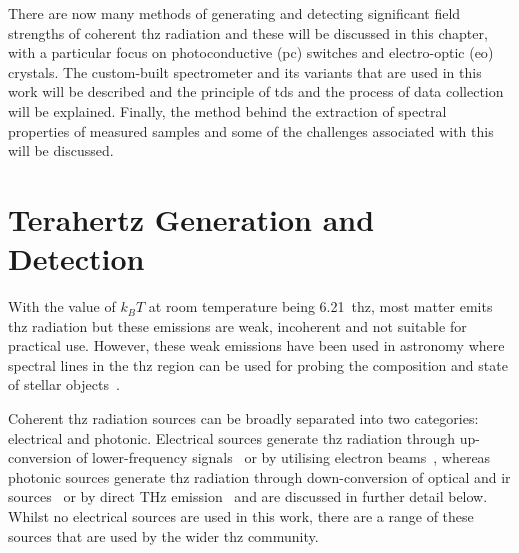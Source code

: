 There are now many methods of generating and detecting significant field strengths of coherent \acrshort{thz} radiation and these will be discussed in this chapter, with a particular focus on photoconductive (\acrshort{pc}) switches and electro\nobreakdash-optic (\acrshort{eo}) crystals. 
The custom\nobreakdash-built spectrometer and its variants that are used in this work will be described and the principle of \acrshort{tds} and the process of data collection will be explained. 
Finally, the method behind the extraction of spectral properties of measured samples and some of the challenges associated with this will be discussed.

\section{Terahertz Generation and Detection}
With the value of \(k_BT\) at room temperature being \SI{6.21}{\acrshort{thz}}, most matter emits \acrshort{thz} radiation but these emissions are weak, incoherent and not suitable for practical use. However, these weak emissions have been used in astronomy where spectral lines in the \acrshort{thz} region can be used for probing the composition and state of stellar objects~\cite{Stacey2011}.

Coherent \acrshort{thz} radiation sources can be broadly separated into two categories: electrical and photonic. Electrical sources generate \acrshort{thz} radiation through up\nobreakdash-conversion of lower\nobreakdash-frequency signals~\cite{Orihashi2005, Davies2002, Gold1998} or by utilising electron beams~\cite{He2013, Schmidt2002, Williams2002}, whereas photonic sources generate \acrshort{thz} radiation through down\nobreakdash-conversion of optical and \acrshort{ir} sources~\cite{McIntosh1995, Dai2011, Warren1991, Wu1995} or by direct THz emission~\cite{Williams2007,Faist1994} and are discussed in further detail below. Whilst no electrical sources are used in this work, there are a range of these sources that are used by the wider \acrshort{thz} community. 

